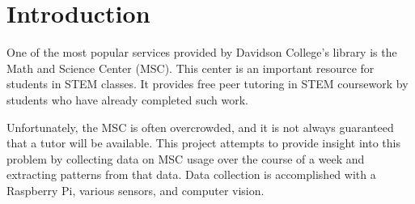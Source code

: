 
\section{Introduction}
\label{sec:intro}

One of the most popular services provided by Davidson College's library is the Math and Science Center (MSC). This center is an important resource for students in STEM classes. It provides free peer tutoring in STEM coursework by students who have already completed such work.

Unfortunately, the MSC is often overcrowded, and it is not always guaranteed that a tutor will be available. This project attempts to provide insight into this problem by collecting data on MSC usage over the course of a week and extracting patterns from that data. Data collection is accomplished with a Raspberry Pi, various sensors, and computer vision. 